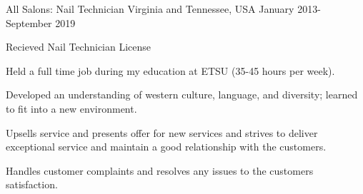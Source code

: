 

\begin{cventries}

  \cventry
    {All Salons:} %
    {Nail Technician} %
    {Virginia and Tennessee, USA} %
    {January 2013-September 2019} %
    {
      \begin{cvitems} %
      \item Recieved Nail Technician License
      \item Held a full time job during my education at ETSU (35-45 hours per week).
      \item Developed an understanding of western culture, language, and diversity; learned to fit into a new environment.
      \item Upsells service and presents offer for new services and strives to deliver exceptional service and maintain a good relationship with the customers.
      \item Handles customer complaints and resolves any issues to the customers satisfaction.
      \end{cvitems}
    }


\end{cventries}
